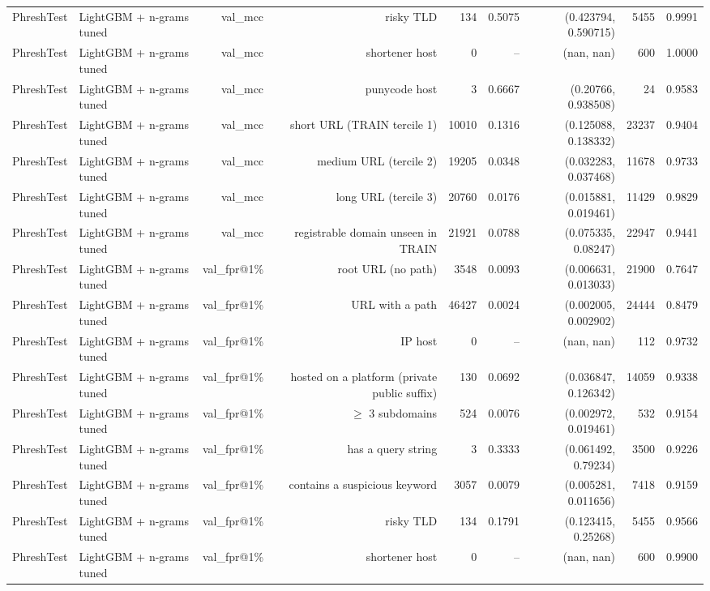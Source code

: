 \begin{table}[t]
\begin{tabular}{llrrrrrrr}
PhreshTest & LightGBM + n-grams tuned & val\_mcc & risky TLD & 134 & 0.5075 & (0.423794, 0.590715) & 5455 & 0.9991 \\
PhreshTest & LightGBM + n-grams tuned & val\_mcc & shortener host & 0 & -- & (nan, nan) & 600 & 1.0000 \\
PhreshTest & LightGBM + n-grams tuned & val\_mcc & punycode host & 3 & 0.6667 & (0.20766, 0.938508) & 24 & 0.9583 \\
PhreshTest & LightGBM + n-grams tuned & val\_mcc & short URL (TRAIN tercile 1) & 10010 & 0.1316 & (0.125088, 0.138332) & 23237 & 0.9404 \\
PhreshTest & LightGBM + n-grams tuned & val\_mcc & medium URL (tercile 2) & 19205 & 0.0348 & (0.032283, 0.037468) & 11678 & 0.9733 \\
PhreshTest & LightGBM + n-grams tuned & val\_mcc & long URL (tercile 3) & 20760 & 0.0176 & (0.015881, 0.019461) & 11429 & 0.9829 \\
PhreshTest & LightGBM + n-grams tuned & val\_mcc & registrable domain unseen in TRAIN & 21921 & 0.0788 & (0.075335, 0.08247) & 22947 & 0.9441 \\
PhreshTest & LightGBM + n-grams tuned & val\_fpr@1\% & root URL (no path) & 3548 & 0.0093 & (0.006631, 0.013033) & 21900 & 0.7647 \\
PhreshTest & LightGBM + n-grams tuned & val\_fpr@1\% & URL with a path & 46427 & 0.0024 & (0.002005, 0.002902) & 24444 & 0.8479 \\
PhreshTest & LightGBM + n-grams tuned & val\_fpr@1\% & IP host & 0 & -- & (nan, nan) & 112 & 0.9732 \\
PhreshTest & LightGBM + n-grams tuned & val\_fpr@1\% & hosted on a platform (private public suffix) & 130 & 0.0692 & (0.036847, 0.126342) & 14059 & 0.9338 \\
PhreshTest & LightGBM + n-grams tuned & val\_fpr@1\% & $\geq$ 3 subdomains & 524 & 0.0076 & (0.002972, 0.019461) & 532 & 0.9154 \\
PhreshTest & LightGBM + n-grams tuned & val\_fpr@1\% & has a query string & 3 & 0.3333 & (0.061492, 0.79234) & 3500 & 0.9226 \\
PhreshTest & LightGBM + n-grams tuned & val\_fpr@1\% & contains a suspicious keyword & 3057 & 0.0079 & (0.005281, 0.011656) & 7418 & 0.9159 \\
PhreshTest & LightGBM + n-grams tuned & val\_fpr@1\% & risky TLD & 134 & 0.1791 & (0.123415, 0.25268) & 5455 & 0.9566 \\
PhreshTest & LightGBM + n-grams tuned & val\_fpr@1\% & shortener host & 0 & -- & (nan, nan) & 600 & 0.9900 \\

\end{tabular}
\end{table}
